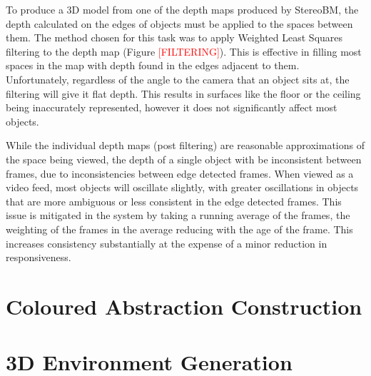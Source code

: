 To produce a 3D model from one of the depth maps produced by StereoBM, the depth calculated on the edges of objects must be applied to the spaces between them. The method chosen for this task was to apply Weighted Least Squares filtering to the depth map (Figure \textcolor{red}{[FILTERING]}). This is effective in filling most spaces in the map with depth found in the edges adjacent to them. Unfortunately, regardless of the angle to the camera that an object sits at, the filtering will give it flat depth. This results in surfaces like the floor or the ceiling being inaccurately represented, however it does not significantly affect most objects.

While the individual depth maps (post filtering) are reasonable approximations of the space being viewed, the depth of a single object with be inconsistent between frames, due to inconsistencies between edge detected frames. When viewed as a video feed, most objects will oscillate slightly, with greater oscillations in objects that are more ambiguous or less consistent in the edge detected frames. This issue is mitigated in the system by taking a running average of the frames, the weighting of the frames in the average reducing with the age of the frame. This increases consistency substantially at the expense of a minor reduction in responsiveness.

\section{Coloured Abstraction Construction}



\section{3D Environment Generation}

